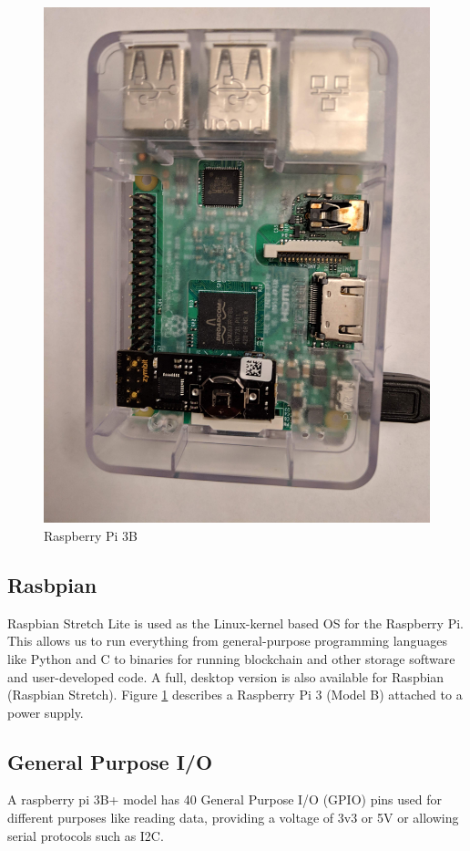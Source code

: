\documentclass[11pt,openright]{report}
\begin{document}
\begin{figure}[!htbp]
    \centering
    \includegraphics[scale=0.1]{images/rpi.jpg}
    \caption{Raspberry Pi 3B}
    \label{fig:rpi}
\end{figure}
\newline
\newline
\subsection{Rasbpian}
Raspbian Stretch Lite is used as the Linux-kernel based OS for the Raspberry Pi. This allows us to run everything from general-purpose programming languages like Python and C to binaries for running blockchain and other storage software and user-developed code. A full, desktop version is also available for Raspbian (Raspbian Stretch). Figure \ref{fig:rpi} describes a Raspberry Pi 3 (Model B) attached to a power supply.
 
\subsection{General Purpose I/O}
A raspberry pi 3B+ model has 40 General Purpose I/O (GPIO) pins used for different purposes like reading data, providing a voltage of 3v3 or 5V or allowing serial protocols such as I2C.
\end{document}

